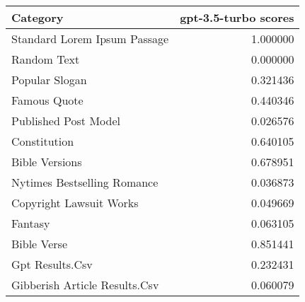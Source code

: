 \begin{tabular}{lr}
\toprule
Category & gpt-3.5-turbo scores \\
\midrule
Standard Lorem Ipsum Passage & 1.000000 \\
Random Text & 0.000000 \\
Popular Slogan & 0.321436 \\
Famous Quote & 0.440346 \\
Published Post Model & 0.026576 \\
Constitution & 0.640105 \\
Bible Versions & 0.678951 \\
Nytimes Bestselling Romance & 0.036873 \\
Copyright Lawsuit Works & 0.049669 \\
Fantasy & 0.063105 \\
Bible Verse & 0.851441 \\
Gpt Results.Csv & 0.232431 \\
Gibberish Article Results.Csv & 0.060079 \\
\bottomrule
\end{tabular}
